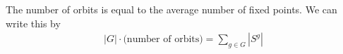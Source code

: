 \documentclass{memoir}
\begin{document}
	
\begin{lemma}
	The number of orbits is equal to the average number of fixed points. We can write this by
	\begin{align*}
		\left| G \right| \cdot \text{(number of orbits)} = \sum_{g\in G} \left| S^{g} \right| 
	\end{align*}
\end{lemma}
\end{document}
